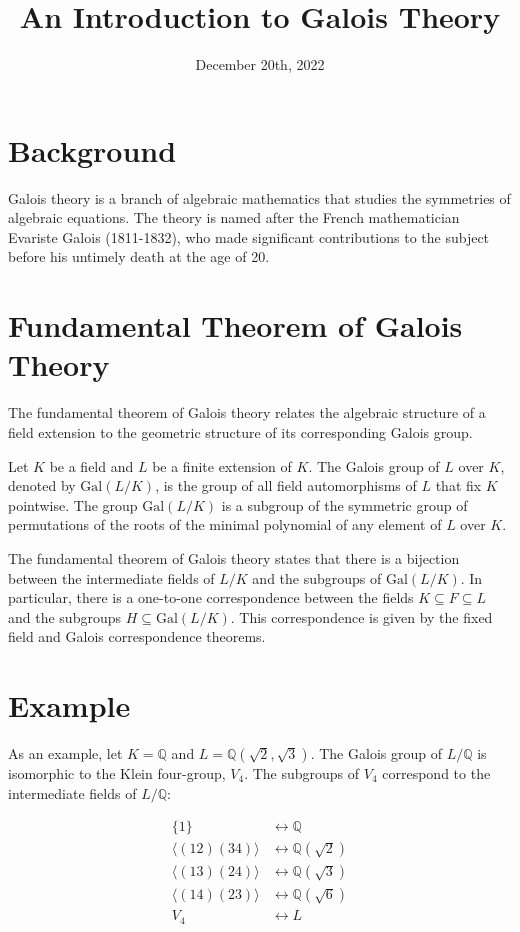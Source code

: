 \documentclass{article}
\begin{document}
\title{An Introduction to Galois Theory}
\date{December 20th, 2022}

\maketitle

\section{Background}

Galois theory is a branch of algebraic mathematics that studies the symmetries of algebraic equations. The theory is named after the French mathematician Evariste Galois (1811-1832), who made significant contributions to the subject before his untimely death at the age of 20.

\section{Fundamental Theorem of Galois Theory}

The fundamental theorem of Galois theory relates the algebraic structure of a field extension to the geometric structure of its corresponding Galois group.

Let $K$ be a field and $L$ be a finite extension of $K$. The Galois group of $L$ over $K$, denoted by $\text{Gal}(L/K)$, is the group of all field automorphisms of $L$ that fix $K$ pointwise. The group $\text{Gal}(L/K)$ is a subgroup of the symmetric group of permutations of the roots of the minimal polynomial of any element of $L$ over $K$.

The fundamental theorem of Galois theory states that there is a bijection between the intermediate fields of $L/K$ and the subgroups of $\text{Gal}(L/K)$. In particular, there is a one-to-one correspondence between the fields $K \subseteq F \subseteq L$ and the subgroups $H \subseteq \text{Gal}(L/K)$. This correspondence is given by the fixed field and Galois correspondence theorems.

\section{Example}

As an example, let $K = \mathbb{Q}$ and $L = \mathbb{Q}(\sqrt{2},\sqrt{3})$. The Galois group of $L/\mathbb{Q}$ is isomorphic to the Klein four-group, $V_4$. The subgroups of $V_4$ correspond to the intermediate fields of $L/\mathbb{Q}$:

\begin{align*}
\{1\} &\longleftrightarrow \mathbb{Q} \\
\langle (12)(34) \rangle &\longleftrightarrow \mathbb{Q}(\sqrt{2}) \\
\langle (13)(24) \rangle &\longleftrightarrow \mathbb{Q}(\sqrt{3}) \\
\langle (14)(23) \rangle &\longleftrightarrow \mathbb{Q}(\sqrt{6}) \\
V_4 &\longleftrightarrow L
\end{align*}
\end{document}
